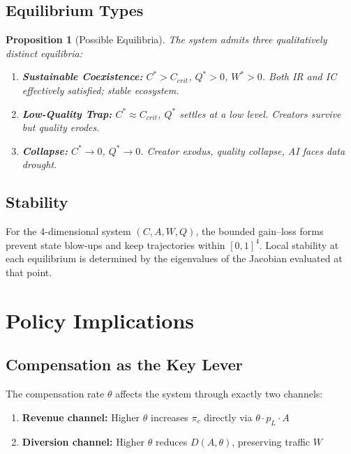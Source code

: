 \documentclass[11pt,a4paper]{article}
\newtheorem{proposition}{Proposition}
\begin{document}
\subsection{Equilibrium Types}

\begin{proposition}[Possible Equilibria]
The system admits three qualitatively distinct equilibria:
\begin{enumerate}
    \item \textbf{Sustainable Coexistence:} $C^* > C_{crit}$, $Q^* > 0$, $W^* > 0$. Both IR and IC effectively satisfied; stable ecosystem.
    \item \textbf{Low-Quality Trap:} $C^* \approx C_{crit}$, $Q^*$ settles at a low level. Creators survive but quality erodes.
    \item \textbf{Collapse:} $C^* \rightarrow 0$, $Q^* \rightarrow 0$. Creator exodus, quality collapse, AI faces data drought.
\end{enumerate}
\end{proposition}

\subsection{Stability}

For the 4-dimensional system $(C, A, W, Q)$, the bounded gain--loss forms prevent state blow-ups and keep trajectories within $[0,1]^4$. Local stability at each equilibrium is determined by the eigenvalues of the Jacobian evaluated at that point.

\section{Policy Implications}

\subsection{Compensation as the Key Lever}

The compensation rate $\theta$ affects the system through exactly two channels:
\begin{enumerate}
    \item \textbf{Revenue channel:} Higher $\theta$ increases $\pi_c$ directly via $\theta \cdot p_L \cdot A$
    \item \textbf{Diversion channel:} Higher $\theta$ reduces $D(A, \theta)$, preserving traffic $W$
\end{enumerate}
\end{document}
